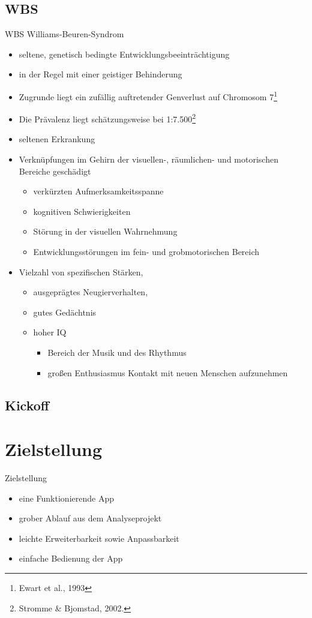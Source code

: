 \documentclass[10pt,fleqn]{beamer}
\begin{document}
\subsection{WBS}
	\begin{frame}[t]{WBS Williams-Beuren-Syndrom}
		\begin{itemize}
			\item seltene, genetisch bedingte Entwicklungsbeeinträchtigung
			\item in der Regel mit einer geistiger Behinderung
			\item Zugrunde liegt ein zufällig auftretender Genverlust auf Chromosom 7\footnote{Ewart et al., 1993} 
			\item Die Prävalenz liegt schätzungsweise bei 1:7.500\footnote{Stromme \& Bjomstad, 2002.}
			\item seltenen Erkrankung
			\item Verknüpfungen im Gehirn der visuellen-, räumlichen- und motorischen Bereiche geschädigt
			\begin{itemize}
				\item verkürzten Aufmerksamkeitsspanne
				\item kognitiven Schwierigkeiten
				\item Störung in der visuellen Wahrnehmung
				\item Entwicklungsstörungen im fein- und grobmotorischen Bereich
			\end{itemize}
			\item Vielzahl von spezifischen Stärken,
			\begin{itemize}
				\item ausgeprägtes Neugierverhalten,
				\item gutes Gedächtnis
				\item hoher IQ
				\begin{itemize}
					\item Bereich der Musik und des Rhythmus
					\item großen Enthusiasmus Kontakt mit neuen Menschen aufzunehmen
				\end{itemize} 
			\end{itemize} 
		\end{itemize}
	\end{frame}

\subsection{Kickoff}

\section{Zielstellung}
\begin{frame}[t]{Zielstellung}
	\begin{itemize}
		\item eine Funktionierende App
		\item grober Ablauf aus dem Analyseprojekt
		\item leichte Erweiterbarkeit sowie Anpassbarkeit
		\item einfache Bedienung der App
	\end{itemize}
\end{frame}
\end{document}
